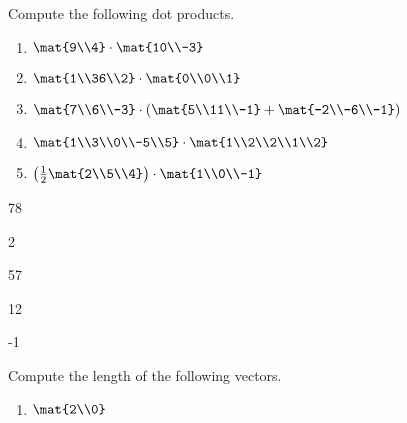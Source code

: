 \begin{exercises}
	\begin{problist}
		\prob  Compute the following dot products.
		\begin{enumerate}
			\item   $\mat{9\\4} \cdot \mat{10\\-3}$
			\item   $\mat{1\\36\\2} \cdot \mat{0\\0\\1}$
			\item   $\mat{7\\6\\-3} \cdot \left(\mat{5\\11\\-1} + \mat{-2\\-6\\-1}\right)$
			\item   $\mat{1\\3\\0\\-5\\5} \cdot \mat{1\\2\\2\\1\\2}$
			\item   $\left(\frac{1}{2}\mat{2\\5\\4}\right) \cdot \mat{1\\0\\-1}$
		\end{enumerate}
		\begin{solution}
			\begin{enumerate*}
				\item 78 
				\item 2 
				\item 57 
				\item 12 
				\item -1 
			\end{enumerate*}
		\end{solution}
		\prob Compute the length of the following vectors.
		\begin{enumerate}
			\item $\mat{2\\0}$

\end{enumerate}
\end{problist}
\end{exercises}
